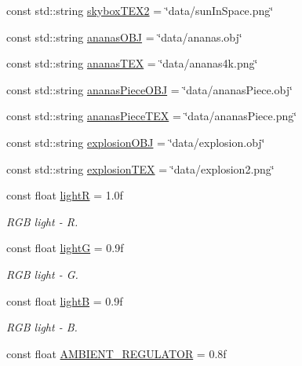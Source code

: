 \begin{DoxyCompactItemize}
\item 
const std\+::string \mbox{\hyperlink{namespacekrizpav6_a136e474c0dc7ff6b349b5c546aae9205}{skybox\+T\+E\+X2}} = \char`\"{}data/sun\+In\+Space.\+png\char`\"{}
\item 
const std\+::string \mbox{\hyperlink{namespacekrizpav6_a6cd2a4963dfe1413e1289e6b093c605e}{ananas\+O\+BJ}} = \char`\"{}data/ananas.\+obj\char`\"{}
\item 
const std\+::string \mbox{\hyperlink{namespacekrizpav6_a3e2dda818b75b6fb31f3d912e2c59303}{ananas\+T\+EX}} = \char`\"{}data/ananas4k.\+png\char`\"{}
\item 
const std\+::string \mbox{\hyperlink{namespacekrizpav6_aa94b393937884856818345ad128069ad}{ananas\+Piece\+O\+BJ}} = \char`\"{}data/ananas\+Piece.\+obj\char`\"{}
\item 
const std\+::string \mbox{\hyperlink{namespacekrizpav6_aea90a116fb5bd0f2c6f5e74473580a46}{ananas\+Piece\+T\+EX}} = \char`\"{}data/ananas\+Piece.\+png\char`\"{}
\item 
const std\+::string \mbox{\hyperlink{namespacekrizpav6_abd5253522f18fe58220d9d16f2e07391}{explosion\+O\+BJ}} = \char`\"{}data/explosion.\+obj\char`\"{}
\item 
const std\+::string \mbox{\hyperlink{namespacekrizpav6_ad6695222990cdf5657755383ca1d728b}{explosion\+T\+EX}} = \char`\"{}data/explosion2.\+png\char`\"{}
\item 
const float \mbox{\hyperlink{namespacekrizpav6_adab0bf8d246a67b02ae41afb73c3e097}{lightR}} = 1.\+0f
\begin{DoxyCompactList}\small\item\em R\+GB light -\/ R. \end{DoxyCompactList}\item 
const float \mbox{\hyperlink{namespacekrizpav6_aa2313319fc9d05cc922097b3b37763b0}{lightG}} = 0.\+9f
\begin{DoxyCompactList}\small\item\em R\+GB light -\/ G. \end{DoxyCompactList}\item 
const float \mbox{\hyperlink{namespacekrizpav6_a112b1f1367a7d4b3753573ab1d3a27c6}{lightB}} = 0.\+9f
\begin{DoxyCompactList}\small\item\em R\+GB light -\/ B. \end{DoxyCompactList}\item 
const float \mbox{\hyperlink{namespacekrizpav6_afb15791f5e8e6465d001c4f31b465bb5}{A\+M\+B\+I\+E\+N\+T\+\_\+\+R\+E\+G\+U\+L\+A\+T\+OR}} = 0.\+8f

\end{DoxyCompactItemize}
